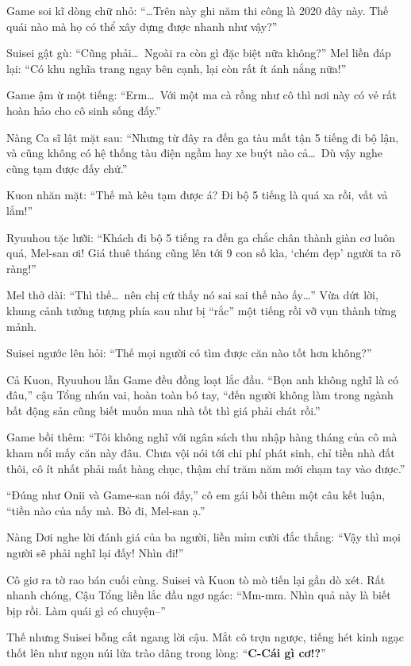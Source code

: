 \documentclass[../main.tex]{subfiles}
\begin{document}
Game soi kĩ dòng chữ nhỏ: ``\dots Trên này ghi năm thi công là 2020 đây này. Thế quái nào mà họ có thể xây dựng được nhanh như vậy?''

Suisei gật gù: ``Cũng phải\dots\ Ngoài ra còn gì đặc biệt nữa không?'' Mel liền đáp lại: ``Có khu nghĩa trang ngay bên cạnh, lại còn rất ít ánh nắng nữa!''

Game ậm ừ một tiếng: ``Erm\dots\ Với một ma cà rồng như cô thì nơi này có vẻ rất hoàn hảo cho cô sinh sống đấy.''

Nàng Ca sĩ lật mặt sau: ``Nhưng từ đây ra đến ga tàu mất tận 5 tiếng đi bộ lận, và cũng không có hệ thống tàu điện ngầm hay xe buýt nào cả\dots\ Dù vậy nghe cũng tạm được đấy chứ.''

Kuon nhăn mặt: ``Thế mà kêu tạm được á? Đi bộ 5 tiếng là quá xa rồi, vất vả lắm!''

Ryuuhou tặc lưỡi: ``Khách đi bộ 5 tiếng ra đến ga chắc chân thành giàn cơ luôn quá, Mel-san ơi! Giá thuê tháng cũng lên tới 9 con số kìa, `chém đẹp' người ta rõ ràng!''

Mel thở dài: ``Thì thế\dots\ nên chị cứ thấy nó sai sai thế nào ấy\dots'' Vừa dứt lời, khung cảnh tưởng tượng phía sau như bị ``rắc'' một tiếng rồi vỡ vụn thành từng mảnh.

Suisei ngước lên hỏi: ``Thế mọi người có tìm được căn nào tốt hơn không?''

Cả Kuon, Ryuuhou lẫn Game đều đồng loạt lắc đầu. ``Bọn anh không nghĩ là có đâu,'' cậu Tổng nhún vai, hoàn toàn bó tay, ``đến người không làm trong ngành bất động sản cũng biết muốn mua nhà tốt thì giá phải chát rồi.''

Game bồi thêm: ``Tôi không nghĩ với ngân sách thu nhập hàng tháng của cô mà kham nổi mấy căn này đâu. Chưa vội nói tới chi phí phát sinh, chỉ tiền nhà đất thôi, cô ít nhất phải mất hàng chục, thậm chí trăm năm mới chạm tay vào được.''

``Đúng như Onii và Game-san nói đấy,'' cô em gái bồi thêm một câu kết luận, ``tiền nào của nấy mà. Bỏ đi, Mel-san ạ.''

Nàng Dơi nghe lời đánh giá của ba người, liền mỉm cười đắc thắng: ``Vậy thì mọi người sẽ phải nghĩ lại đấy! Nhìn đi!''

Cô giơ ra tờ rao bán cuối cùng. Suisei và Kuon tò mò tiến lại gần dò xét. Rất nhanh chóng, Cậu Tổng liền lắc đầu ngơ ngác: ``Mm-mm. Nhìn quả này là biết bịp rồi. Làm quái gì có chuyện--''

Thế nhưng Suisei bỗng cắt ngang lời cậu. Mắt cô trợn ngược, tiếng hét kinh ngạc thốt lên như ngọn núi lửa trào dâng trong lòng: ``\textbf{C-Cái gì cơ!?}''
\end{document}
